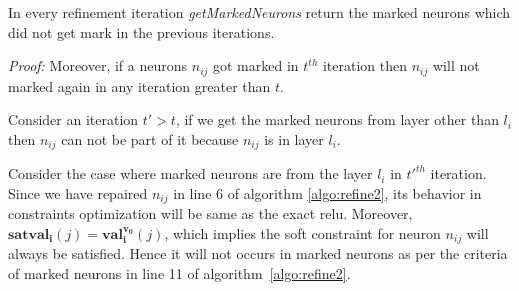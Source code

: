 \begin{theorem}
  \label{th:progress2}
  In every refinement iteration {\em getMarkedNeurons} return the marked neurons which did not get mark in the previous iterations. 
\end{theorem}

{\em Proof: } Moreover, if a neurons $n_{ij}$ got marked in $t^{th}$ iteration then $n_{ij}$ will not marked again 
in any iteration greater than $t$.

Consider an iteration $t' > t$, if we get the marked neurons from layer other than $l_i$ then $n_{ij}$ 
can not be part of it because $n_{ij}$ is in layer $l_i$. 

Consider the case where marked neurons are from the layer $l_i$ in $t'^{th}$ iteration. 
Since we have repaired $n_{ij}$ in line 6 of algorithm \ref{algo:refine2}, its behavior in constraints 
optimization will be same as the exact relu. 
Moreover, $\boldsymbol{satval_i}(j) = \boldsymbol{val_i^{\boldsymbol{v_0}}}(j)$, 
which implies the soft constraint for neuron $n_{ij}$ will always be satisfied. Hence it will not occurs in 
marked neurons as per the criteria of marked neurons in line 11 of algorithm~\ref{algo:refine2}. 
 













